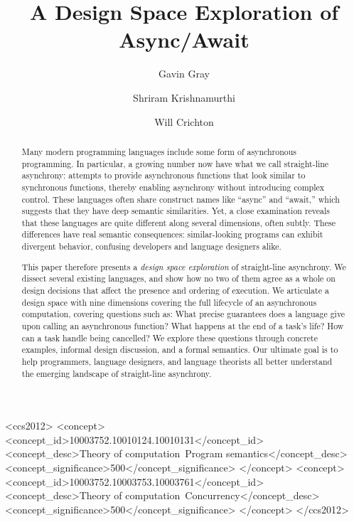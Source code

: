 \documentclass[acmsmall]{acmart}\settopmatter{}
\begin{document}
\title{A Design Space Exploration of Async/Await}

\author{Gavin Gray}
\correspondingauthor
{}

\author{Shriram Krishnamurthi}

\author{Will Crichton}

\setlength{\enumerateparindent}{\parindent}

\begin{abstract}
  Many modern programming languages include some form of asynchronous programming. In particular, a growing number now have what we call straight-line asynchrony: attempts to provide asynchronous functions that look similar to synchronous functions, thereby enabling asynchrony without introducing complex control. These languages often share construct names like ``async'' and ``await,'' which suggests that they have deep semantic similarities. Yet, a close examination reveals that these languages are quite different along several dimensions, often subtly. These differences have real semantic consequences: similar-looking programs can exhibit divergent behavior, confusing developers and language designers alike.

  This paper therefore presents a \emph{design space exploration} of straight-line asynchrony. We dissect several existing languages, and show how no two of them agree as a whole on design decisions that affect the presence and ordering of execution. We articulate a design space with nine dimensions covering the full lifecycle of an asynchronous computation, covering questions such as: What precise guarantees does a language give upon calling an asynchronous function? What happens at the end of a task's life? How can a task handle being cancelled? We explore these questions through concrete examples, informal design discussion, and a formal semantics. Our ultimate goal is to help programmers, language designers, and language theorists all better understand the emerging landscape of straight-line asynchrony.
\end{abstract}

\begin{CCSXML}
<ccs2012>
   <concept>
       <concept_id>10003752.10010124.10010131</concept_id>
       <concept_desc>Theory of computation~Program semantics</concept_desc>
       <concept_significance>500</concept_significance>
       </concept>
   <concept>
       <concept_id>10003752.10003753.10003761</concept_id>
       <concept_desc>Theory of computation~Concurrency</concept_desc>
       <concept_significance>500</concept_significance>
       </concept>
 </ccs2012>
\end{CCSXML}
\end{document}

